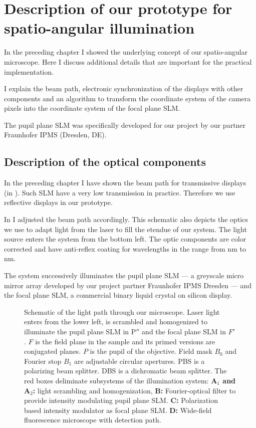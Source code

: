 
\chapter{Description of our prototype for spatio-angular illumination}
\label{sec:dev1}
\begin{summary}
  In the preceding chapter I showed the underlying concept of our
  spatio-angular microscope. Here I discuss additional details that
  are important for the practical implementation.

  I explain the beam path, electronic synchronization of the displays
  with other components and an algorithm to transform the coordinate
  system of the camera pixels into the coordinate system of the focal
  plane SLM.
  
  The pupil plane SLM was specifically developed for our project by    
  our partner Fraunhofer IPMS (Dresden, DE). 
\end{summary}
\section{Description of the optical components}
In the preceding chapter I have shown the beam path for
transmissive displays (in ). Such SLM have a
very low transmission in practice. Therefore we use reflective
displays in our prototype.

In  I adjusted the beam path accordingly. This
schematic also depicts the optics we use to adapt light from the laser
to fill the etendue of our system. The light source enters the system
from the bottom left. The optic components are color corrected and
have anti-reflex coating for wavelengths in the range from
\unit[400]{nm} to \unit[700]{nm}.

The system successively illuminates the pupil plane SLM --- a greyscale
micro mirror array developed by our project partner Fraunhofer IPMS
Dresden --- and the focal plane SLM, a commercial binary liquid crystal
on silicon display.
 
\begin{figure}[!htbp]
  \centering
  \caption{Schematic of the light path through our microscope. Laser
    light enters from the lower left, is scrambled and homogenized to
    illuminate the pupil plane SLM in $\textrm{P}''$ and the focal
    plane SLM in $F'$. $F$ is the field plane in the sample and its
    primed versions are conjugated planes. $P$ is the pupil of the
    objective. Field mask $B_0$ and Fourier stop $B_1$ are adjustable
    circular apertures. PBS is a polarizing beam splitter. DBS is a
    dichromatic beam splitter.  The red boxes deliminate subsystems of
    the illumination system: {\color{Orchid}\bf A$_1$ and A$_2$:}
    light scrambling and homogenization, {\color{Orchid}\bf B:}
    Fourier-optical filter to provide intensity modulating pupil plane
    SLM. {\color{Orchid}\bf C:} Polarization based intensity modulator
    as focal plane SLM. {\color{Orchid}\bf D:} Wide-field fluorescence
    microscope with detection path.}
  \label{fig:memi-real}
\end{figure}

